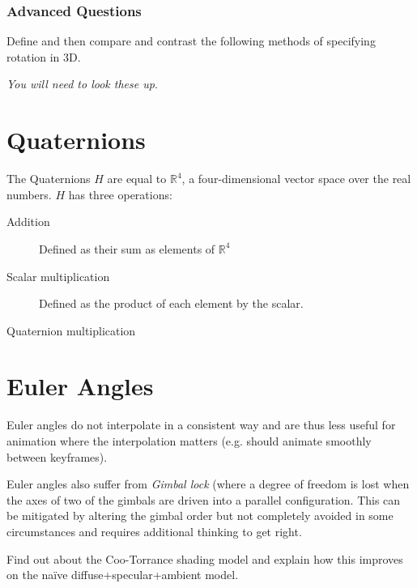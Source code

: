 \documentclass{supervision}
\begin{document}
\section*{Advanced Questions}
\begin{questions}
    \question
    Define and then compare and contrast the following methods of specifying rotation in 3D.
    
    \textit{You will need to look these up}.
    \begin{parts}
        \part{Quaternions}
        \begin{solution}
        The Quaternions $H$ are equal to $\mathbb{R}^4$, a four-dimensional vector space over the real numbers. $H$ has three operations:
        \begin{description}
            \item[Addition]
            Defined as their sum as elements of $\mathbb{R}^4$
            \item[Scalar multiplication]
            Defined as the product of each element by the scalar.
            \item[Quaternion multiplication]
            
            
        \end{description}
        \end{solution}

        \part{Euler Angles}
        \begin{solution}
        \end{solution}

    \end{parts}
    \begin{solution}
    Euler angles do not interpolate in a consistent way and are thus less useful for animation where the interpolation matters (e.g. should animate smoothly between keyframes).
    
    Euler angles also suffer from \textit{Gimbal lock} (where a degree of freedom is lost when the axes of two of the gimbals are driven into a parallel configuration. This can be mitigated by altering the gimbal order but not completely avoided in some circumstances and requires additional thinking to get right.
    
    
    \end{solution}

    \question
    Find out about the Coo-Torrance shading model and explain how this improves on the naïve diffuse+specular+ambient model.
    \begin{solution}
    \end{solution}


\end{questions}
\end{document}
